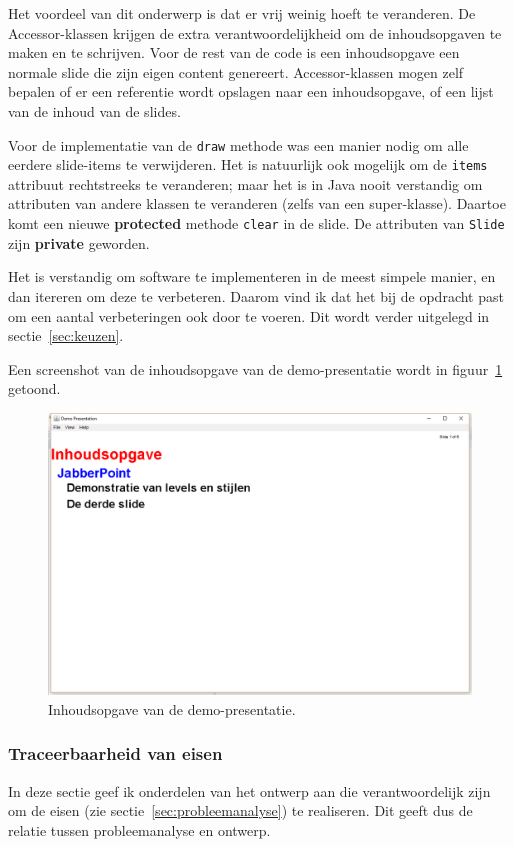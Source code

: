 \documentclass[a4paper]{article}
\newcommand{\code}[1]{\lstinline[columns=fixed]{#1}}
\begin{document}
		Het voordeel van dit onderwerp is dat er vrij weinig hoeft te veranderen.
		De Accessor-klassen krijgen de extra verantwoordelijkheid om de inhoudsopgaven te maken en te schrijven.
		Voor de rest van de code is een inhoudsopgave een normale slide die zijn eigen content genereert.
		Accessor-klassen mogen zelf bepalen of er een referentie wordt opslagen naar een inhoudsopgave, of een lijst van de inhoud van de slides.

		Voor de implementatie van de \code{draw} methode was een manier nodig om alle eerdere slide-items te verwijderen.
		Het is natuurlijk ook mogelijk om de \code{items} attribuut rechtstreeks te veranderen;
		maar het is in Java nooit verstandig om attributen van andere klassen te veranderen (zelfs van een super-klasse).
		Daartoe komt een nieuwe \textbf{protected} methode \code{clear} in de slide.
		De attributen van \code{Slide} zijn \textbf{private} geworden.

		Het is verstandig om software te implementeren in de meest simpele manier, en dan itereren om deze te verbeteren.
		Daarom vind ik dat het bij de opdracht past om een aantal verbeteringen ook door te voeren.
		Dit wordt verder uitgelegd in sectie~\ref{sec:keuzen}.

		Een screenshot van de inhoudsopgave van de demo-presentatie wordt in figuur~\ref{fig:master} getoond.
		\begin{figure}[!htb]
		 \caption{
			Inhoudsopgave van de demo-presentatie.\label{fig:master}
		 }
		 \centering \includegraphics[width=\textwidth]{Screenshots/master.png}
		\end{figure}

    \subsubsection{Traceerbaarheid van eisen}
        In deze sectie geef ik onderdelen van het ontwerp aan die verantwoordelijk zijn om de eisen (zie sectie~\ref{sec:probleemanalyse}) te realiseren.
        Dit geeft dus de relatie tussen probleemanalyse en ontwerp.
\end{document}
